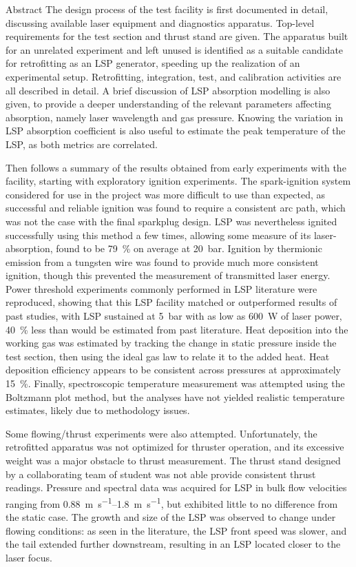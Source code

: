 \begin{plainchp}{Abstract}
    The design process of the test facility is first documented in detail, discussing available laser equipment and diagnostics apparatus. Top-level requirements for the test section and thrust stand are given. The apparatus built for an unrelated experiment and left unused is identified as a suitable candidate for retrofitting as an LSP generator, speeding up the realization of an experimental setup. Retrofitting, integration, test, and calibration activities are all described in detail. A brief discussion of LSP absorption modelling is also given, to provide a deeper understanding of the relevant parameters affecting absorption, namely laser wavelength and gas pressure. Knowing the variation in LSP absorption coefficient is also useful to estimate the peak temperature of the LSP, as both metrics are correlated.

    Then follows a summary of the results obtained from early experiments with the facility, starting with exploratory ignition experiments. The spark-ignition system considered for use in the project was more difficult to use than expected, as successful and reliable ignition was found to require a consistent arc path, which was not the case with the final sparkplug design. LSP was nevertheless ignited successfully using this method a few times, allowing some measure of its laser-absorption, found to be 79~\% on average at \qty{20}{bar}. Ignition by thermionic emission from a tungsten wire was found to provide much more consistent ignition, though this prevented the measurement of transmitted laser energy. Power threshold experiments commonly performed in LSP literature were reproduced, showing that this LSP facility matched or outperformed results of past studies, with LSP sustained at \qty{5}{bar} with as low as \qty{600}{W} of laser power, 40~\% less than would be estimated from past literature. Heat deposition into the working gas was estimated by tracking the change in static pressure inside the test section, then using the ideal gas law to relate it to the added heat. Heat deposition efficiency appears to be consistent across pressures at approximately 15~\%. Finally, spectroscopic temperature measurement was attempted using the Boltzmann plot method, but the analyses have not yielded realistic temperature estimates, likely due to methodology issues.

    Some flowing/thrust experiments were also attempted. Unfortunately, the retrofitted apparatus was not optimized for thruster operation, and its excessive weight was a major obstacle to thrust measurement. The thrust stand designed by a collaborating team of student was not able provide consistent thrust readings. Pressure and spectral data was acquired for LSP in bulk flow velocities ranging from \qtyrange{0.88}{1.8}{m.s^{-1}}, but exhibited little to no difference from the static case. The growth and size of the LSP was observed to change under flowing conditions: as seen in the literature, the LSP front speed was slower, and the tail extended further downstream, resulting in an LSP located closer to the laser focus.


\end{plainchp}
